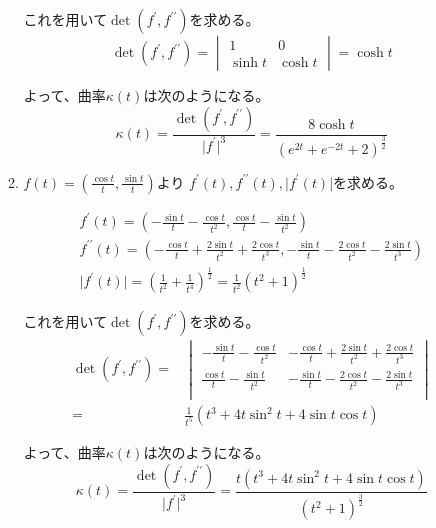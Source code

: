 \documentclass[12pt,b5paper]{ltjsarticle}
\begin{document}
\begin{enumerate}
\begin{enumerate}
      これを用いて$\det(f^{\prime},f^{\prime\prime})$を求める。
      \begin{equation}
       \det(f^{\prime},f^{\prime\prime})=
        \begin{vmatrix}
         1 & 0\\
         \sinh t & \cosh t
        \end{vmatrix}
        = \cosh t
      \end{equation}

      よって、曲率$\kappa(t)$は次のようになる。
      \begin{equation}
       \kappa(t) = \frac{\det(f^{\prime},f^{\prime\prime})}{\lvert f^{\prime} \rvert^3}
        = \frac{8\cosh t}{(e^{2t}+e^{-2t}+2)^{\frac{3}{2}}}
      \end{equation}



 \item
      $f(t)=(\frac{\cos t}{t}, \frac{\sin t}{t})$より
      $f^{\prime}(t), f^{\prime\prime}(t), \lvert f^{\prime}(t) \rvert$を求める。

      \begin{gather}
       f^{\prime}(t) = \left( -\frac{\sin t}{t}-\frac{\cos t}{t^2},\frac{\cos t}{t}-\frac{\sin t}{t^2} \right)\\
       f^{\prime\prime}(t) = \left(
       -\frac{\cos t}{t}+\frac{2\sin t}{t^2}+\frac{2\cos t}{t^3},
       -\frac{\sin t}{t}-\frac{2\cos t}{t^2}-\frac{2\sin t}{t^3}
       \right)\\
       \lvert f^{\prime}(t) \rvert = \left( \frac{1}{t^2}+\frac{1}{t^4} \right)^{\frac{1}{2}}
       =\frac{1}{t^2}(t^2+1)^{\frac{1}{2}}
      \end{gather}

      これを用いて$\det(f^{\prime},f^{\prime\prime})$を求める。
      \begin{align}
       \det(f^{\prime},f^{\prime\prime})=&
        \begin{vmatrix}
         -\frac{\sin t}{t}-\frac{\cos t}{t^2} & -\frac{\cos t}{t}+\frac{2\sin t}{t^2}+\frac{2\cos t}{t^3}\\
         \frac{\cos t}{t}-\frac{\sin t}{t^2} & -\frac{\sin t}{t}-\frac{2\cos t}{t^2}-\frac{2\sin t}{t^3}\\
        \end{vmatrix}\\
        =& \frac{1}{t^5}(t^3+4t\sin^2 t + 4\sin t\cos t)
      \end{align}

      よって、曲率$\kappa(t)$は次のようになる。
      \begin{equation}
       \kappa(t) = \frac{\det(f^{\prime},f^{\prime\prime})}{\lvert f^{\prime} \rvert^3}
        = \frac{ t(t^3+4t\sin^2 t + 4\sin t\cos t) }{( t^2+1 )^{\frac{3}{2}}}
      \end{equation}






\end{enumerate}
\end{enumerate}
\end{document}

